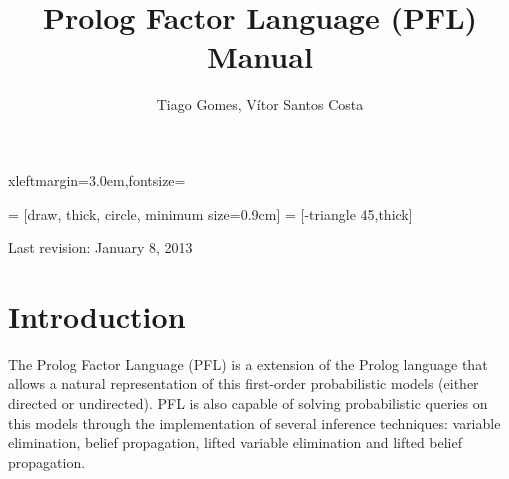 \documentclass{article}
\begin{document}
 {xleftmargin=3.0em,fontsize=\small}

\newenvironment{pflcode}
  {\VerbatimEnvironment \setstretch{0.8} \begin{pflcodeve}}
  {\end{pflcodeve} }

\newcommand{\true}      {\mathtt{t}}
\newcommand{\false}     {\mathtt{f}}
\newcommand{\tableline} {\noalign{\hrule height 0.8pt}}

   = [draw, thick, circle, minimum size=0.9cm]
 = [-triangle 45,thick]

\setlength{\parskip}{\baselineskip}

\title{\Huge\textbf{Prolog Factor Language (PFL) Manual}}
\author{Tiago Gomes, V\'{i}tor Santos Costa}
\date{}

\maketitle
\thispagestyle{empty}
\vspace{5cm}
\begin{center}
  \large Last revision: January 8, 2013
\end{center}
\newpage

\section{Introduction}
The Prolog Factor Language (PFL) is a extension of the Prolog language that allows a natural representation of this first-order probabilistic models (either directed or undirected). PFL is also capable of solving probabilistic  queries on this models through the implementation of several inference techniques: variable elimination, belief propagation, lifted variable elimination and lifted belief propagation.




\end{document}
